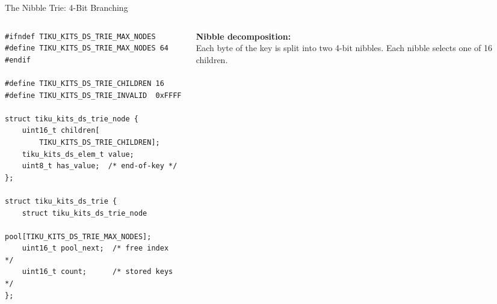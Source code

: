 \documentclass[aspectratio=169, 10pt]{beamer}
\begin{document}
\begin{frame}[fragile]{The Nibble Trie: 4-Bit Branching}
\begin{columns}[T]
\begin{column}{0.48\textwidth}
\begin{lstlisting}[style=cstyle,
  title={ds/trie/tiku\_kits\_ds\_trie.h}]
#ifndef TIKU_KITS_DS_TRIE_MAX_NODES
#define TIKU_KITS_DS_TRIE_MAX_NODES 64
#endif

#define TIKU_KITS_DS_TRIE_CHILDREN 16
#define TIKU_KITS_DS_TRIE_INVALID  0xFFFF

struct tiku_kits_ds_trie_node {
    uint16_t children[
        TIKU_KITS_DS_TRIE_CHILDREN];
    tiku_kits_ds_elem_t value;
    uint8_t has_value;  /* end-of-key */
};

struct tiku_kits_ds_trie {
    struct tiku_kits_ds_trie_node
        pool[TIKU_KITS_DS_TRIE_MAX_NODES];
    uint16_t pool_next;  /* free index  */
    uint16_t count;      /* stored keys */
};
\end{lstlisting}
\end{column}

\begin{column}{0.48\textwidth}
\textbf{Nibble decomposition:}\\
Each byte of the key is split into two 4-bit nibbles.
Each nibble selects one of 16 children.

\vspace{0.5em}
\begin{center}
\end{center}
\end{column}
\end{columns}
\end{frame}
\end{document}
